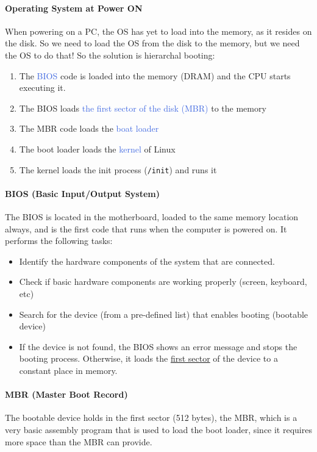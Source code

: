 \documentclass[openany,12pt]{book}
\newcommand{\code}[1]{\texttt{#1}}
\newcommand{\blue}[1]{\textcolor{RoyalBlue}{#1}}
\begin{document}
\paragraph{Operating System at Power ON} When powering on a PC, the OS has yet to load into the memory, as it resides on the disk. So we need to load the OS from the disk to the memory, but we need the OS to do that! So the solution is hierarchal booting: 
\begin{enumerate}
  \item The \blue{BIOS} code is loaded into the memory (DRAM) and the CPU starts executing it.

  \item The BIOS loads \blue{the first sector of the disk (MBR)} to the memory

  \item The MBR code loads the \blue{boat loader}

  \item The boot loader loads the \blue{kernel} of Linux

  \item The kernel loads the init process (\code{/init}) and runs it
\end{enumerate}


\paragraph{BIOS (Basic Input/Output System)} The BIOS is located in the motherboard, loaded to the same memory location always, and is the first code that runs when the computer is powered on. It performs the following tasks:
\begin{itemize}
  \item Identify the hardware components of the system that are connected.
  \item Check if basic hardware components are working properly (screen, keyboard, etc)
  \item Search for the device (from a pre-defined list) that enables booting (bootable device)
  \item If the device is not found, the BIOS shows an error message and stops the booting process. Otherwise, it loads the \ul{first sector} of the device to a constant place in memory.
\end{itemize}


\paragraph{MBR (Master Boot Record)} The bootable device holds in the first sector (512 bytes), the MBR, which is a very basic assembly program that is used to load the boot loader, since it requires more space than the MBR can provide. 
\end{document}
